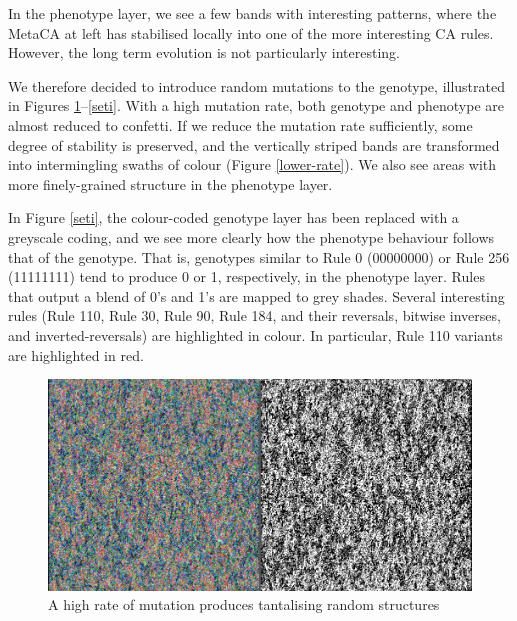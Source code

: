 \documentclass{AISB2008}
\begin{document}
In the phenotype layer, we see a few bands with interesting patterns,
where the MetaCA at left has stabilised locally into one of the more
interesting CA rules.  However, the long term evolution is not
particularly interesting.  

We therefore decided to introduce random mutations to the genotype,
illustrated in Figures \ref{random-mutation}--\ref{seti}.  With a high
mutation rate, both genotype and phenotype are almost reduced to
confetti.  If we reduce the mutation rate sufficiently, some degree of
stability is preserved, and the vertically striped bands are
transformed into intermingling swaths of colour (Figure
\ref{lower-rate}).  We also see areas with more finely-grained
structure in the phenotype layer.  

In Figure \ref{seti}, the colour-coded genotype layer has been
replaced with a greyscale coding, and we see more clearly how the
phenotype behaviour follows that of the genotype.  That is, genotypes
similar to Rule 0 (00000000) or Rule 256 (11111111) tend to produce 0
or 1, respectively, in the phenotype layer.  Rules that output a blend
of 0's and 1's are mapped to grey shades.  Several interesting rules
(Rule 110, Rule 30, Rule 90, Rule 184, and their reversals, bitwise
inverses, and inverted-reversals) are highlighted in colour.  In
particular, Rule 110 variants are highlighted in red.


\begin{figure}
\includegraphics[width=\columnwidth]{big.png}
\caption{A high rate of mutation produces tantalising random structures \label{random-mutation}}
\end{figure}
\end{document}
